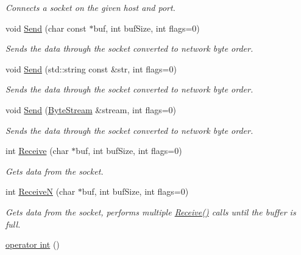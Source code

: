 \begin{DoxyCompactItemize}
\begin{DoxyCompactList}\small\item\em Connects a socket on the given host and port. \end{DoxyCompactList}\item 
void \hyperlink{class_common_1_1_socket_base_aaa38eba12e24be6a7af1e5acaea86e35}{Send} (char const $\ast$buf, int buf\-Size, int flags=0)
\begin{DoxyCompactList}\small\item\em Sends the data through the socket converted to network byte order. \end{DoxyCompactList}\item 
void \hyperlink{class_common_1_1_socket_base_a5e77e1c8181ad417afc35ac0d2523fd3}{Send} (std\-::string const \&str, int flags=0)
\begin{DoxyCompactList}\small\item\em Sends the data through the socket converted to network byte order. \end{DoxyCompactList}\item 
void \hyperlink{class_common_1_1_socket_base_a447176247b0a6dd871f3dbfc80f15792}{Send} (\hyperlink{class_common_1_1_byte_stream}{Byte\-Stream} \&stream, int flags=0)
\begin{DoxyCompactList}\small\item\em Sends the data through the socket converted to network byte order. \end{DoxyCompactList}\item 
int \hyperlink{class_common_1_1_socket_base_a6c7ca728c80f1453c16b286cfd1a6846}{Receive} (char $\ast$buf, int buf\-Size, int flags=0)
\begin{DoxyCompactList}\small\item\em Gets data from the socket. \end{DoxyCompactList}\item 
int \hyperlink{class_common_1_1_socket_base_a99507fbca09521a8af3c1d053728521c}{Receive\-N} (char $\ast$buf, int buf\-Size, int flags=0)
\begin{DoxyCompactList}\small\item\em Gets data from the socket, performs multiple \hyperlink{class_common_1_1_socket_base_a6c7ca728c80f1453c16b286cfd1a6846}{Receive()} calls until the buffer is full. \end{DoxyCompactList}\item 
\hypertarget{class_common_1_1_socket_base_a86a329397a9e7ed24f59676a678f28a3}{\hyperlink{class_common_1_1_socket_base_a86a329397a9e7ed24f59676a678f28a3}{operator int} ()}\label{class_common_1_1_socket_base_a86a329397a9e7ed24f59676a678f28a3}


\end{DoxyCompactItemize}
